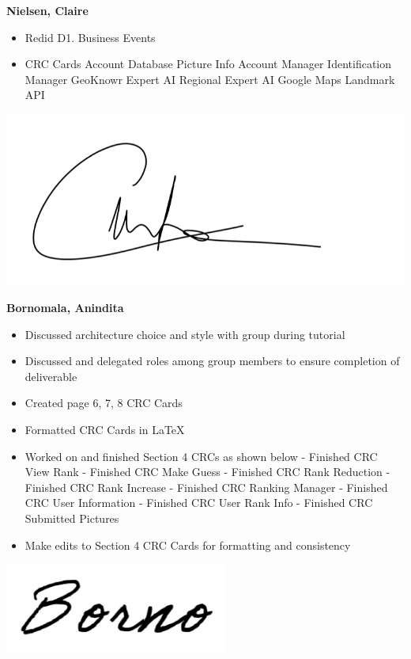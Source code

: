 \documentclass[]{article}
\begin{document}
\textbf{Nielsen, Claire}
\begin{itemize}
        \item Redid D1. Business Events
		\item CRC Cards
			\subitem Account Database
			\subitem Picture Info
			\subitem Account Manager
			\subitem Identification Manager
			\subitem GeoKnowr Expert AI
			\subitem Regional Expert AI
			\subitem Google Maps Landmark API
\end{itemize}
\includegraphics[scale=0.15]{clairesignature.jpg}

\textbf{Bornomala, Anindita}
\begin{itemize}
        \item Discussed architecture choice and style with group during tutorial
        \item Discussed and delegated roles among group members to ensure completion of deliverable
        \item Created page 6, 7, 8 CRC Cards
		\item Formatted CRC Cards in LaTeX
		\item Worked on and finished Section 4 CRCs as shown below
            \subitem - Finished CRC View Rank
            \subitem - Finished CRC Make Guess
            \subitem - Finished CRC Rank Reduction
            \subitem - Finished CRC Rank Increase
            \subitem - Finished CRC Ranking Manager
			\subitem - Finished CRC User Information
			\subitem - Finished CRC User Rank Info
			\subitem - Finished CRC Submitted Pictures
		\item Make edits to Section 4 CRC Cards for formatting and consistency

\end{itemize}
\includegraphics[scale=0.50]{bornosignature.png}
\end{document}
